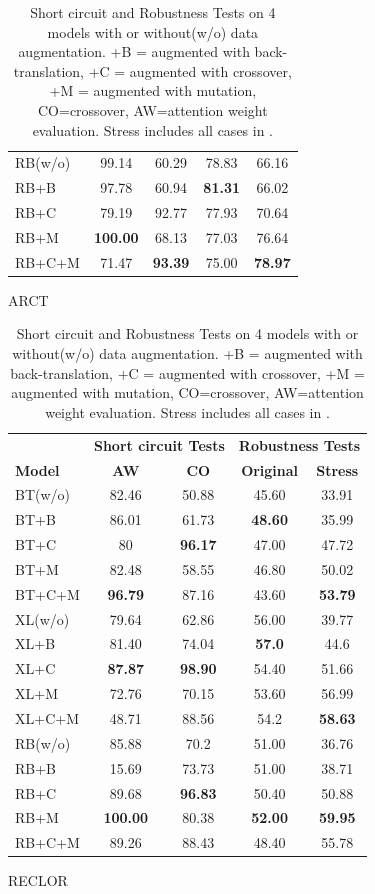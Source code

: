 \begin{table}[th!]
\begin{subtable}[t]{0.48\textwidth}
\begin{tabular}{l|cc|cc}
\rowcolor{Gray}
RB(w/o)&99.14&60.29&78.83&66.16\\
RB+B&97.78&60.94&\textbf{81.31}&66.02\\
RB+C&79.19&92.77&77.93&70.64\\
RB+M&\textbf{100.00}&68.13&77.03&76.64\\
RB+C+M&71.47&\textbf{93.39}&75.00&\textbf{78.97}\\
\bottomrule
\end{tabular}
\caption{ARCT}
\end{subtable} 
\hfill
\begin{subtable}[t]{0.48\textwidth}
\centering
\begin{tabular}{l|cc|cc}\toprule
	& \multicolumn{2}{c|}{\bf Short circuit Tests} & \multicolumn{2}{c}{\bf Robustness Tests} \\ \cline{2-5}
\textbf{Model} &\textbf{AW} &\textbf{CO} & \textbf{Original} &\textbf{Stress}\\ \hline
\rowcolor{Gray}
BT(w/o)&82.46&50.88&45.60&33.91\\
BT+B&86.01&61.73&\textbf{48.60}&35.99\\
BT+C&80&\textbf{96.17}&47.00&47.72\\
BT+M&82.48&58.55&46.80&50.02\\
BT+C+M&\textbf{96.79}&87.16&43.60&\textbf{53.79}\\
\midrule
                 
\rowcolor{Gray}
XL(w/o)&79.64&62.86&56.00&39.77\\
XL+B&81.40&74.04&\textbf{57.0}&44.6\\
XL+C&\textbf{87.87}&\textbf{98.90}&54.40&51.66\\
XL+M&72.76&70.15&53.60&56.99\\
XL+C+M&48.71&88.56&54.2&\textbf{58.63}\\
\midrule
\rowcolor{Gray}
RB(w/o)&85.88&70.2&51.00&36.76\\
RB+B&15.69&73.73&51.00&38.71\\
RB+C&89.68&\textbf{96.83}&50.40&50.88\\
RB+M&\textbf{100.00}&80.38&\textbf{52.00}&\textbf{59.95}\\
RB+C+M&89.26&88.43&48.40&55.78\\
\bottomrule
\end{tabular}
\caption{RECLOR}
\end{subtable}
\caption{\label{tab:results} Short circuit and Robustness Tests
on 4 models with or without(w/o) data augmentation. 
+B = augmented with back-translation,
+C = augmented with crossover, +M = augmented with mutation, 
CO=crossover, AW=attention weight evaluation. 
Stress includes all cases in .}

\end{table}

